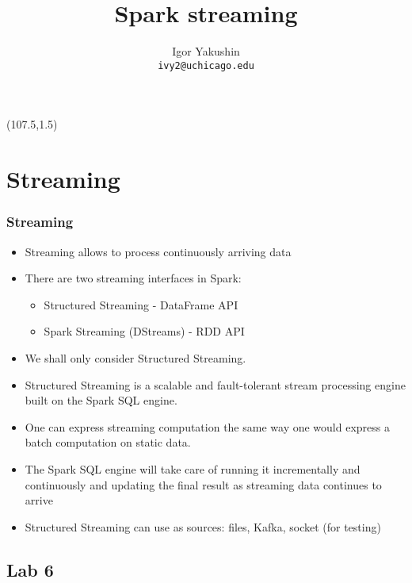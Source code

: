 \documentclass{beamer}
\title{\huge{Spark streaming}}
\author{Igor Yakushin \\ \texttt{ivy2@uchicago.edu}}
\newcommand{\SPARK}{
\begin{textblock}{14}(107.5,1.5)
  \pgfuseimage{spark}
\end{textblock}
}
\begin{document}



\begin{frame}
\SPARK
\titlepage
\end{frame}

\section{Streaming}
\begin{frame}[fragile]
\frametitle{Streaming}
\begin{itemize}
\item Streaming allows to process continuously arriving data
\item There are two streaming interfaces in Spark:
  \begin{itemize}
  \item {\color{mycolordef}Structured Streaming} - DataFrame API
  \item {\color{mycolordef}Spark Streaming (DStreams)} - RDD API
  \end{itemize}
\item We shall only consider Structured Streaming.
\item Structured Streaming is a scalable and fault-tolerant stream processing engine built on the Spark SQL engine. 
\item One can express streaming computation the same way one would express a batch computation on static data. 
\item The Spark SQL engine will take care of running it incrementally and continuously and updating the final result as streaming data continues to arrive
\item Structured Streaming can use as sources: files, Kafka, socket (for testing)
\end{itemize}
\end{frame}

\subsection{Lab 6}
\end{document}

